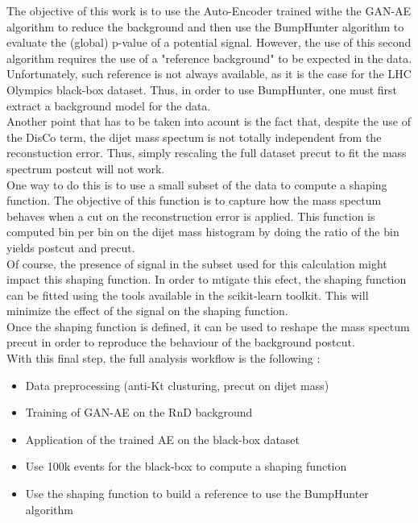 \documentclass[letterpaper,11pt]{article}
\begin{document}
\noindent The objective of this work is to use the Auto-Encoder trained withe the GAN-AE algorithm to reduce the background and then use the BumpHunter algorithm to evaluate the (global) p-value of a potential signal.
However, the use of this second algorithm requires the use of a "reference background" to be expected in the data.
Unfortunately, such reference is not always available, as it is the case for the LHC Olympics black-box dataset.
Thus, in order to use BumpHunter, one must first extract a background model for the data.\\
Another point that has to be taken into acount is the fact that, despite the use of the DisCo term, the dijet mass spectum is not totally independent from the reconstuction error.
Thus, simply rescaling the full dataset precut to fit the mass spectrum postcut will not work. \\

\noindent One way to do this is to use a small subset of the data to compute a shaping function.
The objective of this function is to capture how the mass spectum behaves when a cut on the reconstruction error is applied.
This function is computed bin per bin on the dijet mass histogram by doing the ratio of the bin yields postcut and precut.\\
Of course, the presence of signal in the subset used for this calculation might impact this shaping function.
In order to mtigate this efect, the shaping function can be fitted using the tools available in the scikit-learn toolkit.
This will minimize the effect of the signal on the shaping function.\\
Once the shaping function is defined, it can be used to reshape the mass spectum precut in order to reproduce the behaviour of the background postcut.\\

\noindent With this final step, the full analysis workflow is the following :
\begin{itemize}
	\item Data preprocessing (anti-Kt clusturing, precut on dijet mass)
	\item Training of GAN-AE on the RnD background
	\item Application of the trained AE on the black-box dataset
	\item Use 100k events for the black-box to compute a shaping function
	\item Use the shaping function to build a reference to use the BumpHunter algorithm
\end{itemize}
\end{document}
